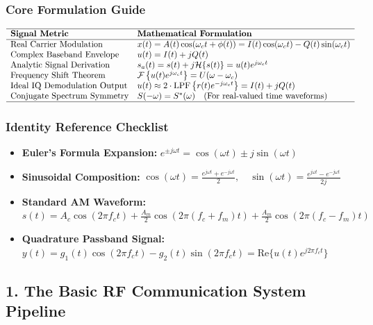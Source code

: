 \documentclass[
]{article}
\providecommand{\tightlist}{%
  \setlength{\itemsep}{0pt}\setlength{\parskip}{0pt}}
\begin{document}
\subsubsection{Core Formulation Guide}\label{core-formulation-guide}

\[\begin{array}{ll}
\hline
\textbf{Signal Metric} & \textbf{Mathematical Formulation} \\ \hline
\text{Real Carrier Modulation} & x(t) = A(t)\cos(\omega_c t + \phi(t)) = I(t)\cos(\omega_c t) - Q(t)\sin(\omega_c t) \\
\text{Complex Baseband Envelope} & u(t) = I(t) + jQ(t) \\
\text{Analytic Signal Derivation} & s_a(t) = s(t) + j \mathcal{H}\{s(t)\} = u(t)e^{j\omega_c t} \\
\text{Frequency Shift Theorem} & \mathcal{F}\left\{ u(t)e^{j\omega_c t} \right\} = U(\omega - \omega_c) \\
\text{Ideal IQ Demodulation Output} & u(t) \approx 2 \cdot \text{LPF}\left\{ r(t)e^{-j\omega_c t} \right\} = I(t) + jQ(t) \\
\text{Conjugate Spectrum Symmetry} & S(-\omega) = S^*(\omega) \quad (\text{For real-valued time waveforms}) \\ \hline
\end{array}\]

\subsubsection{Identity Reference
Checklist}\label{identity-reference-checklist}

\begin{itemize}
\tightlist
\item
  \textbf{Euler's Formula Expansion:}
  \(e^{\pm j\omega t} = \cos(\omega t) \pm j\sin(\omega t)\)
\item
  \textbf{Sinusoidal Composition:}
  \(\cos(\omega t) = \frac{e^{j\omega t} + e^{-j\omega t}}{2}, \quad \sin(\omega t) = \frac{e^{j\omega t} - e^{-j\omega t}}{2j}\)
\item
  \textbf{Standard AM Waveform:}
  \(s(t) = A_c \cos(2\pi f_c t) + \frac{A_m}{2}\cos(2\pi(f_c+f_m)t) + \frac{A_m}{2}\cos(2\pi(f_c-f_m)t)\)
\item
  \textbf{Quadrature Passband Signal:}
  \(y(t) = g_1(t)\cos(2\pi f_c t) - g_2(t)\sin(2\pi f_c t) = \text{Re}\{u(t)e^{j2\pi f_c t}\}\)
\end{itemize}

\subsection{1. The Basic RF Communication System
Pipeline}\label{the-basic-rf-communication-system-pipeline}
\end{document}

